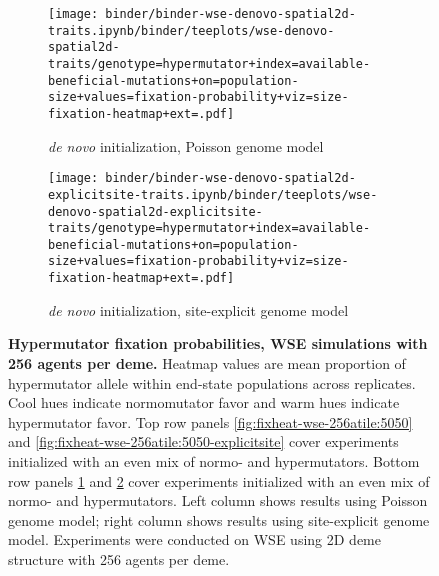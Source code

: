 \begin{figure}[h]
\begin{subfigure}[b]{0.5\linewidth}
    \begin{minipage}{\linewidth}
          \texttt{[image: binder/binder-wse-denovo-spatial2d-traits.ipynb/binder/teeplots/wse-denovo-spatial2d-traits/genotype=hypermutator+index=available-beneficial-mutations+on=population-size+values=fixation-probability+viz=size-fixation-heatmap+ext=.pdf]}%
    \end{minipage}
    \begin{minipage}{\linewidth}
    \caption{\textit{de novo} initialization, Poisson genome model}
    \label{fig:fixheat-wse-256atile:denovo}
    \end{minipage}%
\end{subfigure}%
\begin{subfigure}[b]{0.5\linewidth}
    \begin{minipage}{\linewidth}
          \texttt{[image: binder/binder-wse-denovo-spatial2d-explicitsite-traits.ipynb/binder/teeplots/wse-denovo-spatial2d-explicitsite-traits/genotype=hypermutator+index=available-beneficial-mutations+on=population-size+values=fixation-probability+viz=size-fixation-heatmap+ext=.pdf]}%
    \end{minipage}
    \begin{minipage}{\linewidth}
    \caption{\textit{de novo} initialization, site-explicit genome model}
    \label{fig:fixheat-wse-256atile:denovo-explicitsite}
    \end{minipage}%
\end{subfigure}

  \begin{minipage}{\linewidth}
    \caption{%
\textbf{Hypermutator fixation probabilities, WSE simulations with 256 agents per deme.}
\footnotesize
Heatmap values are mean proportion of hypermutator allele within end-state populations across replicates.
Cool hues indicate normomutator favor and warm hues indicate hypermutator favor.
Top row panels \ref{fig:fixheat-wse-256atile:5050} and \ref{fig:fixheat-wse-256atile:5050-explicitsite} cover experiments initialized with an even mix of normo- and hypermutators.
Bottom row panels \ref{fig:fixheat-wse-256atile:denovo} and \ref{fig:fixheat-wse-256atile:denovo-explicitsite} cover experiments initialized with an even mix of normo- and hypermutators.
Left column shows results using Poisson genome model; right column shows results using site-explicit genome model.
Experiments were conducted on WSE using 2D deme structure with 256 agents per deme.
    }
    \label{fig:fixheat-wse-256atile}
  \end{minipage}
\end{figure}
